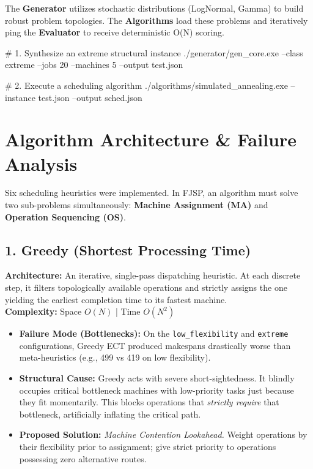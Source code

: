 \documentclass[11pt,a4paper]{article}
\begin{document}
The \textbf{Generator} utilizes stochastic distributions (LogNormal, Gamma) to build robust problem topologies. The \textbf{Algorithms} load these problems and iteratively ping the \textbf{Evaluator} to receive deterministic O(N) scoring.

\vspace{0.5cm}
\begin{tcolorbox}[commandbox, title=Running the Pipeline]
# 1. Synthesize an extreme structural instance
./generator/gen_core.exe --class extreme --jobs 20 --machines 5 --output test.json

# 2. Execute a scheduling algorithm
./algorithms/simulated_annealing.exe --instance test.json --output sched.json
\end{tcolorbox}

\newpage
\section{Algorithm Architecture \& Failure Analysis}

Six scheduling heuristics were implemented. In FJSP, an algorithm must solve two sub-problems simultaneously: \textbf{Machine Assignment (MA)} and \textbf{Operation Sequencing (OS)}. 

\subsection{1. Greedy (Shortest Processing Time)}
\textbf{Architecture:} An iterative, single-pass dispatching heuristic. At each discrete step, it filters topologically available operations and strictly assigns the one yielding the earliest completion time to its fastest machine. \\
\textbf{Complexity:} Space $O(N)$ | Time $O(N^2)$
\begin{itemize}
    \item \textbf{Failure Mode (Bottlenecks):} On the \texttt{low\_flexibility} and \texttt{extreme} configurations, Greedy ECT produced makespans drastically worse than meta-heuristics (e.g., 499 vs 419 on low flexibility).
    \item \textbf{Structural Cause:} Greedy acts with severe short-sightedness. It blindly occupies critical bottleneck machines with low-priority tasks just because they fit momentarily. This blocks operations that \textit{strictly require} that bottleneck, artificially inflating the critical path.
    \item \textbf{Proposed Solution:} \textit{Machine Contention Lookahead.} Weight operations by their flexibility prior to assignment; give strict priority to operations possessing zero alternative routes.
\end{itemize}
\end{document}
